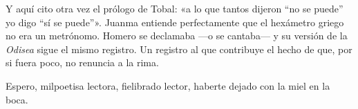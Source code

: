 Y aquí cito otra vez el prólogo de Tobal: «a lo que tantos dijeron “no se puede” yo digo “sí se puede”». Juanma entiende perfectamente que el hexámetro griego no era un metrónomo. Homero se declamaba ---o se cantaba--- y su versión de la \emph{Odisea} sigue el mismo registro. Un registro al que contribuye el hecho de que, por si fuera poco, no renuncia a la rima. 

Espero, milpoetisa lectora, fielibrado lector, haberte dejado con la miel en la boca. 

